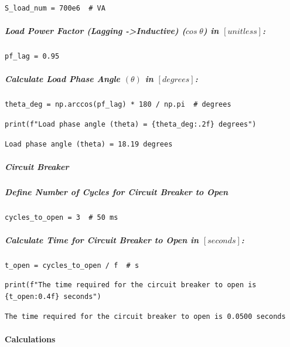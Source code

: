 \begin{verbatim}
S_load_num = 700e6  # VA
\end{verbatim}

\subparagraph{Load Power Factor (Lagging -\textgreater  Inductive) ($cos \; \theta$) in $\left[unitless\right]$:}

\begin{verbatim}
pf_lag = 0.95
\end{verbatim}

\subparagraph{Calculate Load Phase Angle $\left(\theta\right)$ in $\left[degrees\right]$:}

\begin{verbatim}
theta_deg = np.arccos(pf_lag) * 180 / np.pi  # degrees
\end{verbatim}

\begin{verbatim}
print(f"Load phase angle (theta) = {theta_deg:.2f} degrees")
\end{verbatim}

\begin{verbatim}
Load phase angle (theta) = 18.19 degrees
\end{verbatim}

\subparagraph{Circuit Breaker}

\subparagraph{Define Number of Cycles for Circuit Breaker to Open}

\begin{verbatim}
cycles_to_open = 3  # 50 ms
\end{verbatim}

\subparagraph{Calculate Time for Circuit Breaker to Open in $\left[seconds\right]$:}

\begin{verbatim}
t_open = cycles_to_open / f  # s
\end{verbatim}

\begin{verbatim}
print(f"The time required for the circuit breaker to open is {t_open:0.4f} seconds")
\end{verbatim}

\begin{verbatim}
The time required for the circuit breaker to open is 0.0500 seconds
\end{verbatim}

\paragraph{Calculations}

